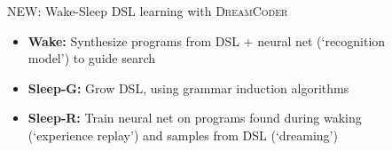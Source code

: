 \documentclass[final]{beamer}
\newlength{\sepwid}
\newlength{\onecolwid}
\newlength{\twocolwid}
\newcommand{\theSystem}{\textsc{DreamCoder}}
\begin{document}
\begin{frame}[t]
\begin{columns}[t]
\begin{column}{\twocolwid}
\begin{columns}[t,totalwidth=\twocolwid] %


\begin{column}{\onecolwid} %




\end{column} %

\end{columns} %

\end{column} %

\begin{column}{\sepwid}\end{column} %

\begin{column}{\onecolwid} %


  \begin{alertblock}{NEW: Wake-Sleep DSL learning with \theSystem}

    \begin{minipage}[c]{0.45\textwidth}
    \begin{itemize}
    \item \textbf{Wake:} Synthesize programs from DSL + neural net (`recognition model') to guide search
    \item \textbf{Sleep-G:} Grow DSL, using grammar induction algorithms
    \item \textbf{Sleep-R:} Train neural net on programs found during waking (`experience replay') and samples from DSL (`dreaming')
    \end{itemize}
    \end{minipage}%
    \begin{minipage}[c]{0.48\textwidth}      
\end{minipage}
\end{alertblock}
\end{column}
\end{columns}
\end{frame}
\end{document}
